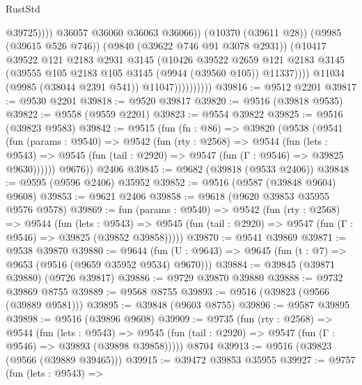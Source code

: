\begin{lexlean}{RustStd}
\begin{coremodule}
                                      @39725))))
                              @36057
                              @36060
                              @36063
                              @36066))
                          (@10370 (@39611 @28))
                          (@9985 (@39615 @526 @746))
                          (@9840 (@39622 @746 @91 @3078 @2931))
                          (@10417
                            @39522
                            @121
                            @2183
                            @2931
                            @3145
                            (@10426
                              @39522
                              @2659
                              @121
                              @2183
                              @3145
                              (@39555 @105 @2183 @105 @3145 (@9944 (@39560 @105)) @11337))))
                        @11034
                        (@9985 (@38044 @2391 @541))
                        @11047))))))))))
@39816 := @9512 @2201
@39817 := @9530 @2201
@39818 := @9520 @39817
@39820 := @9516 (@39818 @9535)
@39822 := @9558 (@9559 @2201)
@39823 := @9554 @39822
@39825 := @9516 (@39823 @9583)
@39842 := @9515
    (fun (fn : @86) =>
    @39820
      (@9538
        (@9541
          (fun (params : @9540) =>
          @9542
            (fun (rty : @2568) =>
            @9544
              (fun (lets : @9543) =>
              @9545 (fun (tail : @2920) => @9547 (fun (Γ : @9546) => @39825 @9630))))))
        @9676))
    @2406
@39845 := @9682 (@39818 (@9533 @2406))
@39848 := @9595 (@9596 @2406) @35952
@39852 := @9516 (@9587 (@39848 @9604) @9608)
@39853 := @9621 @2406
@39858 := @9618 (@9620 @39853 @35955 @9576 @9578)
@39869 := fun (params : @9540) =>
  @9542
    (fun (rty : @2568) =>
    @9544
      (fun (lets : @9543) =>
      @9545 (fun (tail : @2920) => @9547 (fun (Γ : @9546) => @39825 (@39852 @39858)))))
@39870 := @9541 @39869
@39871 := @9538 @39870
@39880 := @9644
    (fun (U : @9643) => @9645 (fun (t : @7) => @9653 (@9516 (@9659 @35952 @9534) @9670)))
@39884 := @39845 (@39871 @39880) (@9726 @39817)
@39886 := @9729 @39870 @39880
@39888 := @9732 @39869 @8755
@39889 := @9568 @8755
@39893 := @9516 (@39823 (@9566 (@39889 @9581)))
@39895 := @39848 (@9603 @8755)
@39896 := @9587 @39895
@39898 := @9516 (@39896 @9608)
@39909 := @9735
    (fun (rty : @2568) =>
    @9544
      (fun (lets : @9543) =>
      @9545 (fun (tail : @2920) => @9547 (fun (Γ : @9546) => @39893 (@39898 @39858)))))
    @8704
@39913 := @9516 (@39823 (@9566 (@39889 @39465)))
@39915 := @39472 @39853 @35955
@39927 := @9757
    (fun (lets : @9543) =>

\end{coremodule}
\end{lexlean}
